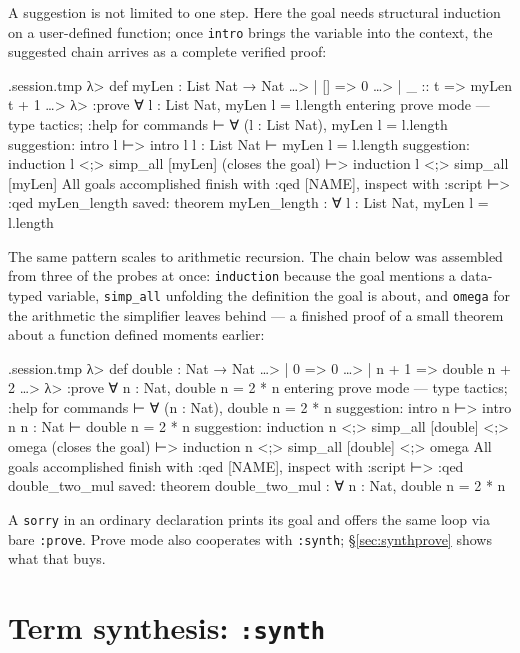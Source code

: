 \documentclass[11pt,oneside]{article}
\newcommand{\code}[1]{\texttt{#1}}
\newenvironment{session}
 {\VerbatimEnvironment\begin{VerbatimOut}{\jobname.session.tmp}}
 {\end{VerbatimOut}%
  \begin{sessionouter}%
  \VerbatimInput[fontsize=\footnotesize, breaklines=true,
    breaksymbolleft={\textcolor{stone}{\footnotesize$\hookrightarrow$}},
    formatcom=\color{ink}, tabsize=4]{\jobname.session.tmp}%
  \end{sessionouter}}
\begin{document}
A suggestion is not limited to one step.  Here the goal needs
structural induction on a user-defined function; once \code{intro}
brings the variable into the context, the suggested chain arrives as a
complete verified proof:

\begin{session}
λ> def myLen : List Nat → Nat
…>   | [] => 0
…>   | _ :: t => myLen t + 1
…>
λ> :prove ∀ l : List Nat, myLen l = l.length
entering prove mode — type tactics; :help for commands
⊢ ∀ (l : List Nat), myLen l = l.length
suggestion: intro l
⊢> intro l
l : List Nat
⊢ myLen l = l.length
suggestion: induction l <;> simp_all [myLen]  (closes the goal)
⊢> induction l <;> simp_all [myLen]
All goals accomplished
finish with :qed [NAME], inspect with :script
⊢> :qed myLen_length
saved: theorem myLen_length : ∀ l : List Nat, myLen l = l.length
\end{session}

The same pattern scales to arithmetic recursion.  The chain below was
assembled from three of the probes at once: \code{induction} because
the goal mentions a data-typed variable, \code{simp\_all} unfolding
the definition the goal is about, and \code{omega} for the arithmetic
the simplifier leaves behind --- a finished proof of a small theorem
about a function defined moments earlier:

\begin{session}
λ> def double : Nat → Nat
…>   | 0 => 0
…>   | n + 1 => double n + 2
…>
λ> :prove ∀ n : Nat, double n = 2 * n
entering prove mode — type tactics; :help for commands
⊢ ∀ (n : Nat), double n = 2 * n
suggestion: intro n
⊢> intro n
n : Nat
⊢ double n = 2 * n
suggestion: induction n <;> simp_all [double] <;> omega  (closes the goal)
⊢> induction n <;> simp_all [double] <;> omega
All goals accomplished
finish with :qed [NAME], inspect with :script
⊢> :qed double_two_mul
saved: theorem double_two_mul : ∀ n : Nat, double n = 2 * n
\end{session}

A \code{sorry} in an ordinary declaration prints its goal and offers
the same loop via bare \code{:prove}. Prove mode also cooperates with
\code{:synth}; \S\ref{sec:synthprove} shows what that buys.

\section{Term synthesis: \code{:synth}}\label{sec:synth}
\end{document}
